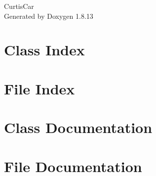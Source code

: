 \documentclass[twoside]{book}
\newcommand{\+}{\discretionary{\mbox{\scriptsize$\hookleftarrow$}}{}{}}
\newcommand{\clearemptydoublepage}{%
  \newpage{\pagestyle{empty}\cleardoublepage}%
}
\begin{document}
\hypersetup{pageanchor=false,
             bookmarksnumbered=true,
             pdfencoding=unicode
            }
\begin{titlepage}
\vspace*{7cm}
\begin{center}%
{\Large Curtis\+Car }\\
\vspace*{1cm}
{\large Generated by Doxygen 1.8.13}\\
\end{center}
\end{titlepage}
\clearemptydoublepage
{}
\tableofcontents
\clearemptydoublepage
{}
\hypersetup{pageanchor=true}

\chapter{Class Index}

\chapter{File Index}

\chapter{Class Documentation}



\chapter{File Documentation}






































































\backmatter
\newpage
{}
\clearemptydoublepage
{}
\printindex
\end{document}
